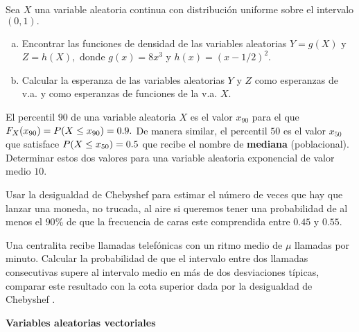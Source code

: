 \documentclass[12pt]{article}
\begin{document}
\probl  Sea $X$ una variable aleatoria continua con distribución uniforme sobre el
intervalo  $(0,1).$
\begin{enumerate}[a)]
\item Encontrar las funciones de densidad de las variables aleatorias
 $Y
= g(X)$ y $Z = h(X),$ donde $g(x) = 8 x^3$ y $h(x) = (x-1/2)^2.$
\item  Calcular la esperanza de las variables aleatorias $Y$ y
$Z$ como esperanzas de v.a. y como esperanzas de funciones de la v.a. $X$. 
 \end{enumerate}





\probl  El percentil $90$ de una variable aleatoria $X$ es el valor $x_{90}$ para el que $
\displaystyle F_{X}(x_{90}) = P(X \leq x_{90}) = 0.9. $ De manera similar, el percentil
$50$ es el valor $x_{50}$ que satisface $ P(X \leq x_{50}) = 0.5 $ que recibe el nombre
de  {\bf mediana} (poblacional). Determinar estos dos valores para  una variable aleatoria
exponencial de valor medio $10$. 

\probl  Usar la desigualdad de Chebyshef para estimar el número de veces que hay  que
lanzar una moneda, no trucada, al aire si queremos tener una probabilidad de al menos
 el $90$\% de que la frecuencia de caras este comprendida entre $0.45$ y $0.55$.

\probl  Una centralita recibe llamadas telefónicas con un ritmo medio de $\mu$ llamadas por
minuto. Calcular la probabilidad de que el intervalo entre dos llamadas consecutivas supere
al intervalo  medio en más de dos desviaciones típicas, comparar este resultado con la cota
superior dada por la desigualdad de Chebyshef .




\newpage

\begin{centerline}
{{\bf Variables aleatorias vectoriales}}
\end{centerline}
\end{document}
